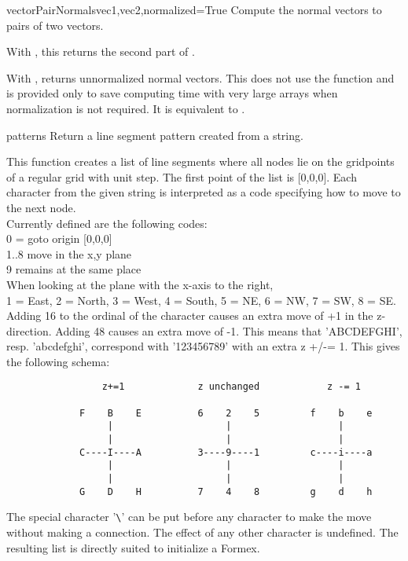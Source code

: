 \begin{funcdesc}{vectorPairNormals}{vec1,vec2,normalized=True}
Compute the normal vectors to pairs of two vectors.

With , this returns the second part of .

With , returns unnormalized normal vectors. This does not use the  function and is provided only to save computing time with very large arrays when normalization is not required. It is equivalent to .

\end{funcdesc}


\begin{funcdesc}{pattern}{s}
Return a line segment pattern created from a string.

This function creates a list of line segments where all nodes lie on the gridpoints of a regular grid with unit step.
The first point of the list is [0,0,0]. Each character from the given string is interpreted as a code specifying how to move to the next node.\\
Currently defined are the following codes:\\
0 = goto origin [0,0,0]\\
1..8 move in the x,y plane\\
9 remains at the same place\\
When looking at the plane with the x-axis to the right,\\
1 = East, 2 = North, 3 = West, 4 = South, 5 = NE, 6 = NW, 7 = SW, 8 = SE.\\
Adding 16 to the ordinal of the character causes an extra move of +1 in the z-direction. Adding 48 causes an extra move of -1. This means that 'ABCDEFGHI', resp. 'abcdefghi', correspond with '123456789' with an extra z +/-= 1. This gives the following schema:
\begin{verbatim}
                 z+=1             z unchanged            z -= 1
            
             F    B    E          6    2    5         f    b    e 
                  |                    |                   |     
                  |                    |                   |     
             C----I----A          3----9----1         c----i----a  
                  |                    |                   |     
                  |                    |                   |     
             G    D    H          7    4    8         g    d    h
\end{verbatim}             
The special character '\verb?\?' can be put before any character to make the move without making a connection. The effect of any other character is undefined. The resulting list is directly suited to initialize a Formex.
\end{funcdesc}


